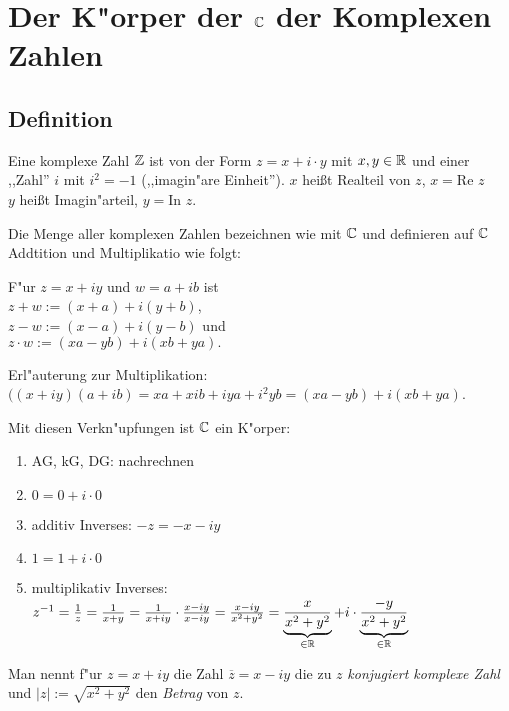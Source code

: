\section{Der K"orper der $\mathbb{C}$ der Komplexen Zahlen} 

\subsection{Definition}
Eine komplexe Zahl $\mathbb{Z}$ ist von der Form $z=x+i\cdot y$ mit $x, y \in \mathbb{R}$ und einer ,,Zahl'' $i$ mit $i^2=-1$ (,,imagin"are Einheit''). $x$ heißt Realteil von $z$, $x=$Re $z$\\
$y$ heißt Imagin"arteil, $y=$In $z$.

Die Menge aller komplexen Zahlen bezeichnen wie mit $\mathbb{C}$ und definieren auf $\mathbb{C}$ Addtition und Multiplikatio wie folgt:

F"ur $z=x+iy$ und $w=a+ib$ ist \\$z+w:= (x+a) + i (y+b)$, \\$z-w:= (x-a) + i (y-b)$ und \\$z\cdot w:= (xa-yb) + i(xb+ya).$

Erl"auterung zur Multiplikation: $((x+iy)(a+ib) = xa + xib + iya + i^2yb = (xa-yb) + i(xb+ya)$.

Mit diesen Verkn"upfungen ist $\mathbb{C}$ ein K"orper:
\begin{enumerate}
	\item
	AG, kG, DG: nachrechnen
	\item
	$0=0+i\cdot 0$
	\item
	additiv Inverses: $-z = -x-iy$
	\item
	$1=1+i\cdot 0$
	\item
	multiplikativ Inverses: $z^{-1}= \frac{1}{z}= \frac{1}{x+y}=\frac{1}{x+iy}\cdot\frac{x-iy}{x-iy}= \frac{x-iy}{x^2+y^2}=\underbrace{\frac{x}{x^2+y^2}}_{\in \mathbb{R}}+ i \cdot \underbrace{\frac{-y}{x^2+y^2}}_{\in \mathbb{R}}$
\end{enumerate}
	Man nennt f"ur $z=x+iy$ die Zahl $ \overline{z} = x-iy$ die zu $z$ \emph{konjugiert komplexe Zahl} und $|z| := \sqrt{x^2+y^2}$ den \emph{Betrag} von $z$.

